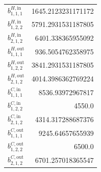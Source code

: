\documentclass{article}%
\begin{document}
\begin{multicols*}{3}
\begin{supertabular}{lr}
	$b_{1,1,1}^{H,\text{in}}$ & 1645.2123231171172 \\%
	$b_{1,2,2}^{H,\text{in}}$ & 5791.2931531187805 \\%
	$b_{2,1,2}^{H,\text{in}}$ & 6401.338365955092 \\%
	$b_{1,1,1}^{H,\text{out}}$ & 936.5054762358975 \\%
	$b_{1,2,2}^{H,\text{out}}$ & 3841.2931531187805 \\%
	$b_{2,1,2}^{H,\text{out}}$ & 4014.3986362769224 \\%
	$b_{1,1,1}^{C,\text{in}}$ & 8536.93972967817 \\%
	$b_{1,2,2}^{C,\text{in}}$ & 4550.0 \\%
	$b_{2,1,2}^{C,\text{in}}$ & 4314.317288687376 \\%
	$b_{1,1,1}^{C,\text{out}}$ & 9245.64657655939 \\%
	$b_{1,2,2}^{C,\text{out}}$ & 6500.0 \\%
	$b_{2,1,2}^{C,\text{out}}$ & 6701.257018365547 \\%
\end{supertabular}%
\end{multicols*}%
\clearpage%
\end{document}
